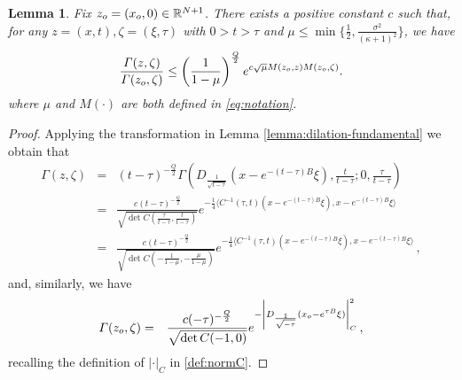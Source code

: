 \documentclass{amsart}
\newtheorem{lemma}[thm]{Lemma}
\numberwithin{equation}{section}
\def \r{{\mathbb{R}}}
\renewcommand{\Gamma}{\varGamma}
\begin{document}
{{\begin{lemma}\label{rapporto}
Fix $z_{\rm o}=(x_{\rm o},0) \in \r^{N+1}$. There exists a positive constant $c$ such that, for any $z=(x,t),\zeta=(\xi,\tau)$ with $0>t>\tau$ and $\mu\leq\min{\{\frac{1}{2},\frac{\sigma^2}{(\kappa+1)^2}\}}$, we have
\[
\frac{\Gamma(z,\zeta)}{\Gamma(z_{\rm o},\zeta)}\leq\left(\frac{1}{1-\mu}\right)^{\frac{Q}{2}}e^{c\sqrt{\mu}M(z_{\rm o},z)M(z_{\rm o},\zeta)}.
\]
where $\mu$ and $M(\cdot)$ are both defined in \eqref{eq:notation}.
\end{lemma}
\begin{proof} 
Applying the  transformation in Lemma \ref{lemma:dilation-fundamental} we obtain that 
\begin{eqnarray*}
  \Gamma(z,\zeta)  & = & (t-\tau)^{-\frac{Q}{2}} \Gamma(D_{\frac{1}{\sqrt{t-\tau}}}(x-e^{-(t-\tau)B}\xi),\frac{t}{t-\tau};0,\frac{\tau}{t-\tau})\\
  & = & \frac{c(t-\tau)^{-\frac{Q}{2}}}{\sqrt{\det C(\frac{\tau}{t-\tau},\frac{t}{t-\tau})}}e^{-\frac{1}{4}\langle C^{-1}(\tau,t)(x-e^{-(t-\tau)B}\xi),x-e^{-(t-\tau)B}\xi\rangle}\\
   & = & \frac{c(t-\tau)^{-\frac{Q}{2}}}{\sqrt{\det C(-\frac{1}{1-\mu},-\frac{\mu}{1-\mu})}}e^{-\frac{1}{4}\langle C^{-1}(\tau,t)(x-e^{-(t-\tau)B}\xi),x-e^{-(t-\tau)B}\xi\rangle}\,,
\end{eqnarray*}
and, similarly, we have
\begin{eqnarray*}
    \Gamma(z_{\rm o},\zeta) &=&\frac{c(-\tau)^{-\frac{Q}{2}}}{\sqrt{\det C(-1,0)}}e^{-\left|D_{\frac{1}{\sqrt{-\tau}}}(x_{\rm o}-e^{\tau B}\xi)\right|_C^2}\,,
\end{eqnarray*}
recalling the definition of $|\cdot|_C$ in \eqref{def:normC}. 


\end{proof}}}
\end{document}
